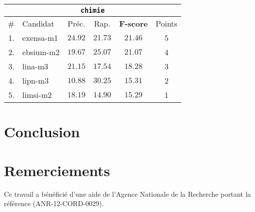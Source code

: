 \documentclass[10pt,twoside]{article}
\begin{document}
\begin{center}
\begin{tabular}{| r l | c c c c |}
\hline
\multicolumn{6}{|c|}{\texttt{chimie}} \\
\hline
\# & Candidat & Préc. & Rap. & \textbf{F-score} & Points \\
\hline
1. & exensa-m1 & $24.92$ & $21.73$ & $\mathbf{21.46}$ & 5  \\
2. & ebsium-m2 & $19.67$ & $25.07$ & $\mathbf{21.07}$ & 4  \\
3. & lina-m3 & $21.15$ & $17.54$ & $\mathbf{18.28}$ & 3  \\
4. & lipn-m3 & $10.88$ & $30.25$ & $\mathbf{15.31}$ & 2  \\
5. & limsi-m2 & $18.19$ & $14.90$ & $\mathbf{15.29}$ & 1  \\
\hline
\end{tabular}

\end{center}
    
    \section{Conclusion}
        

    \section*{Remerciements}
        Ce travail a bénéficié d'une aide de l'Agence Nationale de la Recherche portant la référence \mbox{(ANR-12-CORD-0029)}.

    
    
\end{document}
